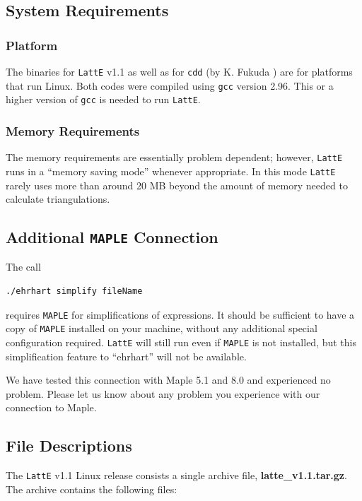 \documentclass{article}
\begin{document}
\subsection{System Requirements}

\subsubsection{Platform} 
The binaries for {\tt LattE} v1.1 as well as for {\tt cdd} (by
K. Fukuda \cite{fukuda}) are for platforms that run Linux. Both codes
were compiled using {\tt gcc} version 2.96. This or a higher version
of {\tt gcc} is needed to run {\tt LattE}. 

\subsubsection{Memory Requirements} 
The memory requirements are essentially problem dependent; however,
{\tt LattE} runs in a ``memory saving mode'' whenever appropriate.
In this mode {\tt LattE} rarely uses more than around 20 MB beyond the
amount of memory needed to calculate triangulations. 

\subsection{Additional {\tt MAPLE} Connection}
The call
\begin{verbatim}
./ehrhart simplify fileName
\end{verbatim}
requires {\tt MAPLE} for simplifications of expressions. It should be
sufficient to have a copy of {\tt MAPLE} installed on your machine,
without any additional special configuration required.  {\tt LattE}
will still run even if {\tt MAPLE} is not installed, but this
simplification feature to ``ehrhart'' will not be available. 

We have tested this connection with Maple 5.1 and 8.0 and experienced
no problem. Please let us know about any problem you experience with
our connection to Maple.

\subsection{File Descriptions} 
The {\tt LattE} v1.1 Linux release consists a single archive file,
\textbf{latte\_v1.1.tar.gz}. The archive contains the following files:
\end{document}

